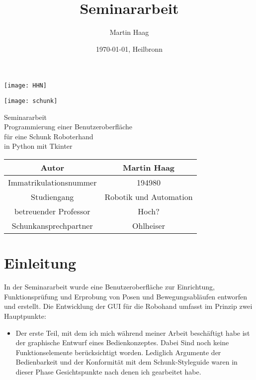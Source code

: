 \documentclass[11pt]{scrartcl}
\title{Seminararbeit}
\author{Martin Haag}
\date{\today{}, Heilbronn}
\begin{document}
\begin{onehalfspace}

\begin{minipage}[t]{0.4\textwidth}
\texttt{[image: HHN]}
\end{minipage}
\hfill
\begin{minipage}[t]{0.4\textwidth}
\texttt{[image: schunk]}
\end{minipage}
\vspace{2cm}


\begin{center}
\begin{Huge}

Seminararbeit \\

\vspace{1cm}
Programmierung einer Benutzeroberfläche \\
für eine Schunk Roboterhand\\
in Python mit Tkinter\\
\vspace{3cm}
\end{Huge}

\begin{Large}


\begin{tabular}{|c|c|}
\hline
 Autor& Martin Haag \\
 \hline
 Immatrikulationsnummer& 194980 \\
\hline
 Studiengang& Robotik und Automation \\
\hline
 betreuender Professor & Hoch?  \\
\hline 
  Schunkansprechpartner& Ohlheiser\\
\hline
\end{tabular}
\end{Large}
\end{center}
\newpage

\tableofcontents
\newpage

\section{Einleitung}
In der Seminararbeit wurde eine Benutzeroberfläche zur Einrichtung, Funktionsprüfung und Erprobung von Posen und Bewegungsabläufen entworfen und erstellt. 
Die Entwicklung der GUI für die Robohand umfasst im Prinzip zwei Hauptpunkte:
\begin{itemize}
\item Der erste Teil, mit dem ich mich während meiner Arbeit beschäftigt habe ist  der graphische Entwurf eines Bedienkonzeptes. Dabei Sind noch keine Funktionselemente berücksichtigt worden. Lediglich Argumente der Bedienbarkeit und der Konformität mit dem Schunk-Styleguide waren in dieser Phase Gesichtspunkte nach denen ich gearbeitet habe.


\end{itemize}
\end{onehalfspace}
\end{document}
